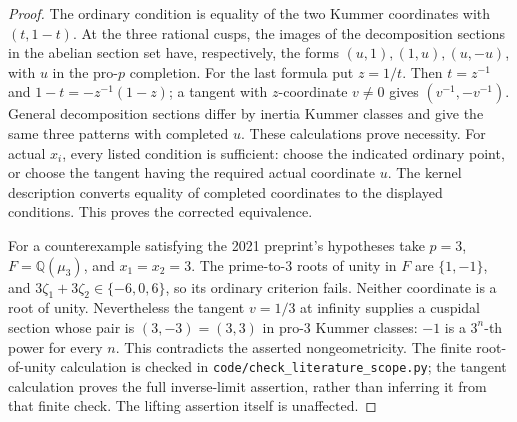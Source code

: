 \begin{proof}
The ordinary condition is equality of the two Kummer coordinates with
\((t,1-t)\). At the three rational cusps, the images of the decomposition
sections in the abelian section set have, respectively, the forms
\((u,1),(1,u),(u,-u)\), with \(u\) in the pro-\(p\) completion.
For the last formula put \(z=1/t\). Then
\(t=z^{-1}\) and \(1-t=-z^{-1}(1-z)\); a tangent with
\(z\)-coordinate \(v\ne0\) gives \((v^{-1},-v^{-1})\).
General decomposition sections differ by inertia Kummer classes and
give the same three patterns with completed \(u\).
These calculations prove necessity. For actual \(x_i\), every listed
condition is sufficient: choose the indicated ordinary point, or choose
the tangent having the required actual coordinate \(u\). The kernel
description converts equality of completed coordinates to the displayed
conditions. This proves the corrected equivalence.

For a counterexample satisfying the 2021 preprint's hypotheses take
\(p=3\), \(F=\mathbb Q(\mu_3)\), and \(x_1=x_2=3\).
The prime-to-3 roots of unity in \(F\) are \(\{1,-1\}\), and
\(3\zeta_1+3\zeta_2\in\{-6,0,6\}\), so its ordinary criterion
fails. Neither coordinate is a root of unity. Nevertheless the tangent
\(v=1/3\) at infinity supplies a cuspidal section whose pair is
\((3,-3)=(3,3)\) in pro-3 Kummer classes: \(-1\) is a
\(3^n\)-th power for every \(n\). This contradicts the asserted
nongeometricity. The finite root-of-unity calculation is checked in
\texttt{code/check\_literature\_scope.py}; the tangent calculation proves
the full inverse-limit assertion, rather than inferring it from that
finite check. The lifting assertion itself is unaffected.
\end{proof}

